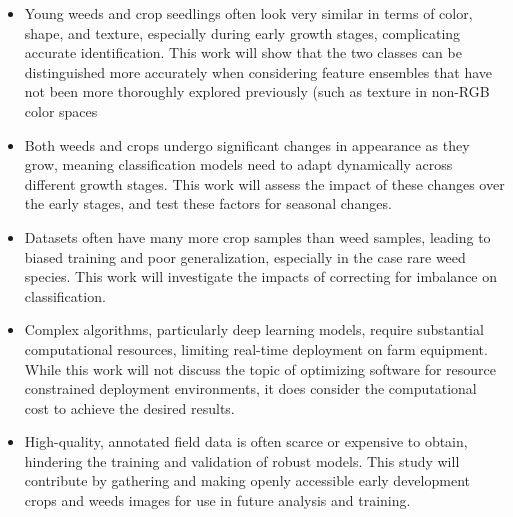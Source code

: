 \documentclass[letterpaper, notitlepage]{report}
\begin{document}
\begin{itemize}

\item{Young weeds and crop seedlings often look very similar in terms of color, shape, and texture, especially during early growth stages, complicating accurate identification. This work will show that the two classes can be distinguished more accurately when considering feature ensembles  that have not been more thoroughly explored previously (such as texture in non-RGB color spaces}

\item{Both weeds and crops undergo significant changes in appearance as they grow, meaning classification models need to adapt dynamically across different growth stages. This work will assess the impact of these changes over the early stages, and test these factors for seasonal changes.}

\item{Datasets often have many more crop samples than weed samples, leading to biased training and poor generalization, especially in the case  rare weed species. This work will investigate the impacts of correcting for imbalance on classification.}

\item{Complex algorithms, particularly deep learning models, require substantial computational resources, limiting real-time deployment on farm equipment. While this work will not discuss the topic of optimizing software for resource constrained deployment environments, it does consider the computational cost to achieve the desired results.}

\item{High-quality, annotated field data is often scarce or expensive to obtain, hindering the training and validation of robust models. This  study will contribute  by gathering and making openly accessible early development crops and weeds images for use in future analysis and training.}

\end{itemize}
\end{document}
